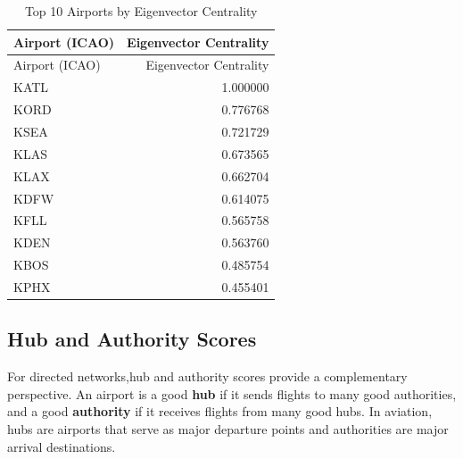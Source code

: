 \documentclass[
  letterpaper,
]{report}
\begin{document}
\begin{longtable}[]{@{}lr@{}}
\caption{Top 10 Airports by Eigenvector Centrality}\tabularnewline
\toprule\noalign{}
Airport (ICAO) & Eigenvector Centrality \\
\midrule\noalign{}
\endfirsthead
\toprule\noalign{}
Airport (ICAO) & Eigenvector Centrality \\
\midrule\noalign{}
\endhead
\bottomrule\noalign{}
\endlastfoot
KATL & 1.000000 \\
KORD & 0.776768 \\
KSEA & 0.721729 \\
KLAS & 0.673565 \\
KLAX & 0.662704 \\
KDFW & 0.614075 \\
KFLL & 0.565758 \\
KDEN & 0.563760 \\
KBOS & 0.485754 \\
KPHX & 0.455401 \\
\end{longtable}

\subsection{Hub and Authority Scores}\label{hub-and-authority-scores}

For directed networks,hub and authority scores provide a complementary
perspective. An airport is a good \textbf{hub} if it sends flights to
many good authorities, and a good \textbf{authority} if it receives
flights from many good hubs. In aviation, hubs are airports that serve
as major departure points and authorities are major arrival
destinations.
\end{document}

